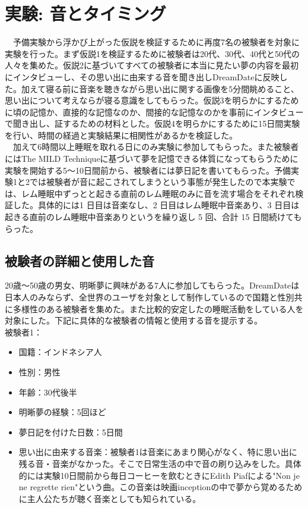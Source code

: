 \section{実験: 音とタイミング}
　予備実験から浮かび上がった仮説を検証するために再度7名の被験者を対象に実験を行った。まず仮説1を検証するために被験者は20代、30代、40代と50代の人々を集めた。仮説2に基づいてすべての被験者に本当に見たい夢の内容を最初にインタビューし、その思い出に由来する音を聞き出しDreamDateに反映した。加えて寝る前に音楽を聴きながら思い出に関する画像を5分間眺めること、思い出について考えならが寝る意識をしてもらった。仮説3を明らかにするために頃の記憶か、直接的な記憶なのか、間接的な記憶なのかを事前にインタビューで聞き出し、証するための材料とした。仮説4を明らかにするために15日間実験を行い、時間の経過と実験結果に相関性があるかを検証した。\\
　加えて6時間以上睡眠を取れる日にのみ実験に参加してもらった。また被験者にはThe MILD Techniqueに基づいて夢を記憶できる体質になってもらうために実験を開始する5〜10日間前から、被験者には夢日記を書いてもらった。予備実験1と2では被験者が音に起こされてしまうという事態が発生したので本実験では、レム睡眠中ずっとと起きる直前のレム睡眠のみに音を流す場合をそれぞれ検証した。具体的には1 日目は音楽なし、2 日目はレム睡眠中音楽あり、3 日目は起きる直前のレム睡眠中音楽ありというを繰り返し 5 回、合計 15 日間続けてもらった。

\subsection{被験者の詳細と使用した音}
20歳〜50歳の男女、明晰夢に興味がある7人に参加してもらった。DreamDateは日本人のみならず、全世界のユーザを対象として制作しているので国籍と性別共に多様性のある被験者を集めた。また比較的安定したの睡眠活動をしている人を対象にした。下記に具体的な被験者の情報と使用する音を提示する。\\

被験者1：
\begin{itemize}
\item 国籍：インドネシア人
\item 性別：男性
\item 年齢：30代後半
\item 明晰夢の経験：5回ほど
\item 夢日記を付けた日数：5日間
\item 思い出に由来する音楽：被験者1は音楽にあまり関心がなく、特に思い出に残る音・音楽がなかった。そこで日常生活の中で音の刷り込みをした。具体的には実験10日間前から毎日コーヒーを飲むときにEdith Piafによる"Non je ne regrette rien"という曲。この音楽は映画inceptionの中で夢から覚めるために主人公たちが聴く音楽としても知られている。
\end{itemize}

